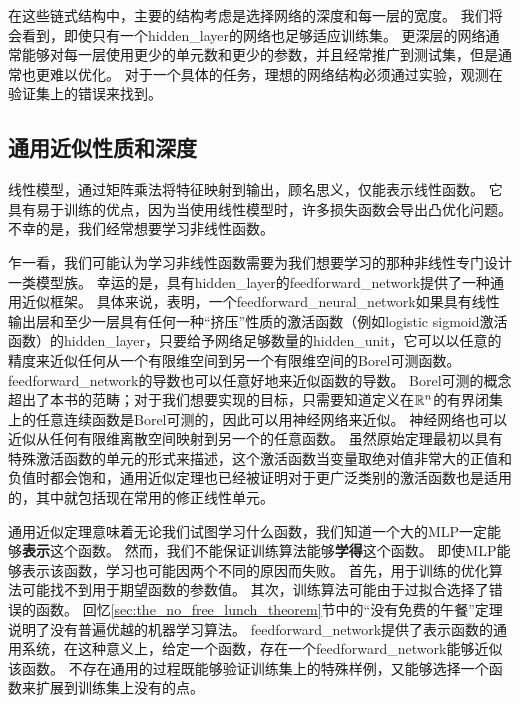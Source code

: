 在这些链式结构中，主要的结构考虑是选择网络的深度和每一层的宽度。
我们将会看到，即使只有一个\gls{hidden_layer}的网络也足够适应训练集。
更深层的网络通常能够对每一层使用更少的单元数和更少的参数，并且经常推广到测试集，但是通常也更难以优化。
对于一个具体的任务，理想的网络结构必须通过实验，观测在验证集上的错误来找到。

\subsection{通用近似性质和深度}
\label{sec:universal_approximation_properties_and_depth}

线性模型，通过矩阵乘法将特征映射到输出，顾名思义，仅能表示线性函数。
它具有易于训练的优点，因为当使用线性模型时，许多损失函数会导出凸优化问题。
不幸的是，我们经常想要学习非线性函数。

乍一看，我们可能认为学习非线性函数需要为我们想要学习的那种非线性专门设计一类模型族。
幸运的是，具有\gls{hidden_layer}的\gls{feedforward_network}提供了一种通用近似框架。
具体来说，\citep{Hornik89,Cybenko89}表明，一个\gls{feedforward_neural_network}如果具有线性输出层和至少一层具有任何一种``挤压''性质的激活函数（例如logistic sigmoid激活函数）的\gls{hidden_layer}，只要给予网络足够数量的\gls{hidden_unit}，它可以以任意的精度来近似任何从一个有限维空间到另一个有限维空间的Borel可测函数。
\gls{feedforward_network}的导数也可以任意好地来近似函数的导数\citep{hornik1990universal}。
Borel可测的概念超出了本书的范畴；对于我们想要实现的目标，只需要知道定义在$\mathbb{R}^n$的有界闭集上的任意连续函数是Borel可测的，因此可以用神经网络来近似。
神经网络也可以近似从任何有限维离散空间映射到另一个的任意函数。
虽然原始定理最初以具有特殊激活函数的单元的形式来描述，这个激活函数当变量取绝对值非常大的正值和负值时都会饱和，通用近似定理也已经被证明对于更广泛类别的激活函数也是适用的，其中就包括现在常用的修正线性单元\citep{Leshno-et-al-1993}。


通用近似定理意味着无论我们试图学习什么函数，我们知道一个大的MLP一定能够\textbf{表示}这个函数。
然而，我们不能保证训练算法能够\textbf{学得}这个函数。
即使MLP能够表示该函数，学习也可能因两个不同的原因而失败。
首先，用于训练的优化算法可能找不到用于期望函数的参数值。
其次，训练算法可能由于过拟合选择了错误的函数。
回忆\ref{sec:the_no_free_lunch_theorem}节中的``没有免费的午餐''定理说明了没有普遍优越的机器学习算法。
\gls{feedforward_network}提供了表示函数的通用系统，在这种意义上，给定一个函数，存在一个\gls{feedforward_network}能够近似该函数。
不存在通用的过程既能够验证训练集上的特殊样例，又能够选择一个函数来扩展到训练集上没有的点。

